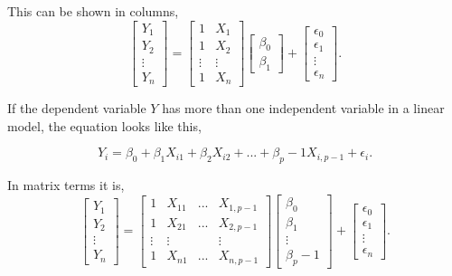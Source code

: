 \noindent This can be shown in columns,
$$
\left[
\begin{array}{c}
	Y_1 \\ 
	Y_2 \\ 
	\vdots \\
	Y_n 
\end{array}
\right]
=
\left[
\begin{array}{cc}
	1 & X_1 \\ 
	1 & X_2 \\ 
	\vdots & \vdots \\
	1 & X_n
\end{array}
\right]
\left[
\begin{array}{c}
	\beta_0 \\ 
	\beta_1 
\end{array}
\right]
+
\left[
\begin{array}{c}
	\epsilon_0 \\ 
	\epsilon_1 \\
	\vdots \\
	\epsilon_n 
\end{array}
\right].
$$

\noindent If the dependent variable $Y$ has more than one independent variable in a linear model, the equation looks like this, 

$$Y_i = \beta_0 + \beta_1 X_{i1} + \beta_2 X_{i2} + ... + \beta_p-1 X_{i, p-1} + \epsilon_i .$$

\noindent In matrix terms it is,  
$$
\left[
\begin{array}{c}
	Y_1 \\ 
	Y_2 \\ 
	\vdots \\
	Y_n 
\end{array}
\right]
=
\left[
\begin{array}{cccc}
	1 & X_{11} & ... & X_{1, p-1} \\ 
	1 & X_{21} & ... & X_{2, p-1} \\ 
	\vdots & \vdots &  & \vdots \\
	1 & X_{n1} & ... & X_{n, p-1}
\end{array}
\right]
\left[
\begin{array}{c}
	\beta_0 \\ 
	\beta_1 \\
	\vdots \\
	\beta_p-1 
\end{array}
\right]
+
\left[
\begin{array}{c}
	\epsilon_0 \\ 
	\epsilon_1 \\
	\vdots \\
	\epsilon_n 
\end{array}
\right].
$$

